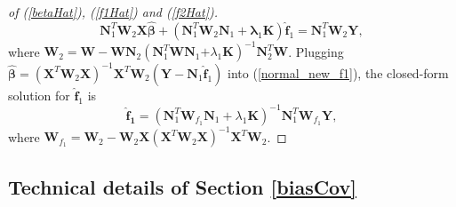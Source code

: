 \documentclass[article,lineno]{biometrika}
\begin{document}
\begin{proof} [of (\ref{betaHat}),  (\ref{f1Hat}) and  (\ref{f2Hat})]
\begin{equation}
\boldsymbol N_1^T  \boldsymbol W_2
\boldsymbol X \boldsymbol {\hat \beta} 
+ 
(\boldsymbol N_1^T  \boldsymbol W_2
\boldsymbol N_1 + \boldsymbol \lambda_1 \boldsymbol K)
\boldsymbol {\hat f}_1
=
\boldsymbol N_1^T  \boldsymbol W_2
\boldsymbol Y,
\end{equation}
where 
$\boldsymbol W_2 =
 \boldsymbol W 
 -
\boldsymbol W \boldsymbol N_2 
 (\boldsymbol N_1^T  \boldsymbol W \boldsymbol N_1 \boldsymbol 
 + \lambda_1 \boldsymbol K)^{-1} 
 \boldsymbol N_2^T  \boldsymbol W$.
Plugging $ \boldsymbol {\hat \beta} = 
(\boldsymbol X^T  \boldsymbol W_2\boldsymbol X)^{-1}  
\boldsymbol X^T  \boldsymbol W_2 (\boldsymbol Y
  - \boldsymbol N_1 \boldsymbol {\hat f}_1) 
$
into  (\ref{normal_new_f1}), the closed-form solution for $ \boldsymbol {\hat f}_1$ is
$$
 \boldsymbol {\hat f_1} 
 =
  (\boldsymbol N_1^T 
\boldsymbol W_{f_1}  \boldsymbol N_1
  + \lambda_1 \boldsymbol K)^{-1}  \boldsymbol N_1^T \boldsymbol W_{f_1} \boldsymbol Y,
  $$
 where
 $\boldsymbol W_{f_1}  =  \boldsymbol W_2 - \boldsymbol W_2\boldsymbol X(\boldsymbol X^T  \boldsymbol W_2\boldsymbol X)^{-1}  \boldsymbol X^T  \boldsymbol W_2$.  
 \end{proof}

%
%
\subsection*{Technical details of Section \ref{biasCov}} 
\end{document}
